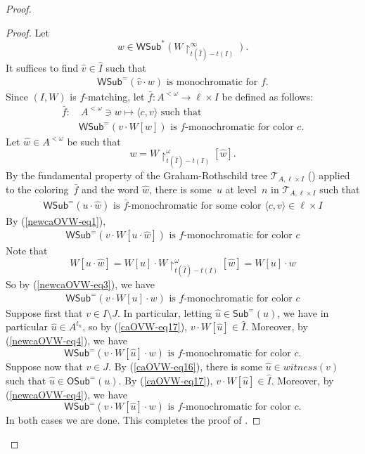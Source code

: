 \documentclass{article}
\def\h{\hat}
\def\uhr{\upharpoonright}
\def\wsamelong{\mathsf{WSub}^{=}}
\def\wshorter{\mathsf{WSub}^{*}}
\def\T{\mathcal{T}}
\newcommand{\OSub}{\mathsf{OSub}}
\newcommand{\WSub}{\mathsf{WSub}}
\newcommand{\SubW}{\mathsf{Sub}}
\numberwithin{theorem}{section}
\theoremstyle{definition}
\newcommand{\ludovic}[1]{\textcolor{blue}{#1}}
\begin{document}
\begin{proof}
\begin{proof}
Let $$w\in \wshorter(W\uhr_{t(\h I)-t(I)}^\infty).$$
It suffices to find $\h v\in \h I$ such that
\begin{align}\label{caOVW-eq20}
\wsamelong(\h v\cdot w)\text{ is monochromatic for $f$.}
\end{align}
Since $(I, W)$ is $f$-matching, let $\bar f : A^{<\omega} \to \ell \times I$ be defined as follows:
\begin{align}\label{newcaOVW-eq1}
\bar f: &\ A^{<\omega}\ni w \mapsto \langle c, v\rangle
\text{ such that }\\ \nonumber
&\text{$\wsamelong(v\cdot W[w])$ is $f$-monochromatic for color~$c$}.
\end{align}
Let $\hat w \in A^{<\omega}$ be such that
$$w = W\uhr_{t(\h I)-t(I)}^\omega[\hat w].$$
By the fundamental property of the Graham-Rothschild tree $\T_{A,\ell \times I}$ () applied to the coloring~$\bar f$ and the word $\hat w$, there is some~$u$ at level~$n$ in $\T_{A,\ell \times I}$ such that
\begin{align}\label{newcaOVW-eq2}
\text{$\WSub^=( u \cdot \hat w)$ is $\bar f$-monochromatic for some color $\langle c, v\rangle \in \ell \times I$} 
\end{align}
By (\ref{newcaOVW-eq1}),
\begin{align}\label{newcaOVW-eq3}
\text{$\WSub^=(v \cdot W[u \cdot \hat w])$ is $f$-monochromatic for color~$c$} 
\end{align}
Note that
$$
W[u \cdot \hat w] = W[u] \cdot W\uhr_{t(\h I)-t(I)}^\omega[\hat w] = W[u] \cdot w
$$
So by (\ref{newcaOVW-eq3}), we have
\begin{align}\label{newcaOVW-eq4}
\text{$\WSub^=(v \cdot W[u] \cdot w)$ is $f$-monochromatic for color~$c$} 
\end{align}
Suppose first that $v \in I \setminus J$. In particular, letting $\hat u \in \SubW^=(u)$,
we have in particular $\hat u \in A^{t_n}$, so by (\ref{caOVW-eq17}), $v \cdot W[\hat u] \in \hat I$. Moreover, by (\ref{newcaOVW-eq4}), we have
$$
\text{$\WSub^=(v \cdot W[\hat u] \cdot w)$ is $f$-monochromatic for color~$c$.} 
$$
Suppose now that $v \in J$. By (\ref{caOVW-eq16}), there is some $\hat u \in witness(v)$ such that $\hat u \in \OSub^=(u)$. By (\ref{caOVW-eq17}), $v \cdot W[\hat u] \in \hat I$. Moreover, by (\ref{newcaOVW-eq4}), we have
$$
\text{$\WSub^=(v \cdot W[\hat u] \cdot w)$ is $f$-monochromatic for color~$c$.} 
$$
In both cases we are done. This completes the proof of .



\end{proof}
\end{proof}
\end{document}
